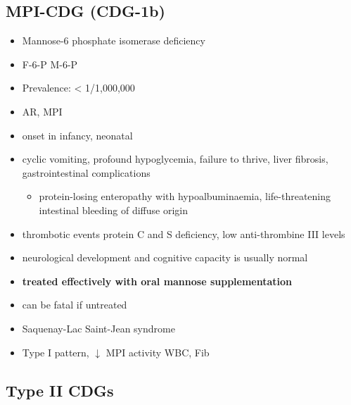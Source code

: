 \documentclass{scrartcl}
\begin{document}
\subsection{MPI-CDG (CDG-1b)}
\label{sec:org3d22b2a}
\begin{itemize}
\item Mannose-6 phosphate isomerase deficiency
\item F-6-P \ce{<=>} M-6-P

\item Prevalence: \textless{} 1/1,000,000
\item AR, MPI
\item onset in infancy, neonatal

\item cyclic vomiting, profound hypoglycemia, failure to thrive, liver
fibrosis, gastrointestinal complications
\begin{itemize}
\item protein-losing enteropathy with hypoalbuminaemia, life-threatening
intestinal bleeding of diffuse origin
\end{itemize}
\item thrombotic events protein C and S deficiency, low anti-thrombine III levels
\item neurological development and cognitive capacity is usually normal
\item \textbf{treated effectively with oral mannose supplementation}
\item can be fatal if untreated
\item Saquenay-Lac Saint-Jean syndrome
\item Type I pattern, \(\downarrow\) MPI activity WBC, Fib
\end{itemize}

\subsection{Type II CDGs}
\label{sec:orga6c39a2}
\end{document}
